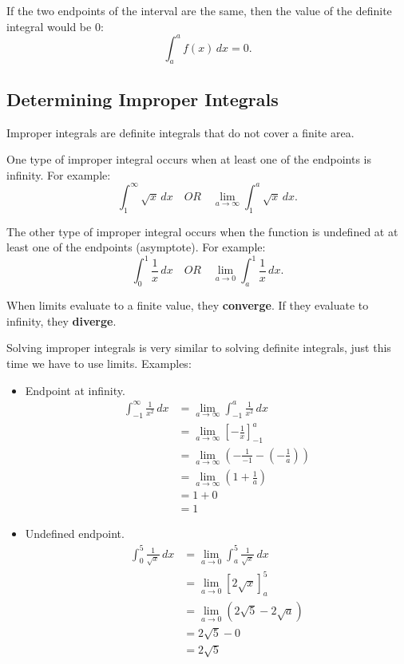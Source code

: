 \documentclass[12pt]{article}
\begin{document}
If the two endpoints of the interval are the same, then the value of the definite integral would be $0$:
\[ \int_{a}^{a} f(x) \, dx = 0. \]

\subsection{Determining Improper Integrals}
\noindent Improper integrals are definite integrals that do not cover a finite area.

One type of improper integral occurs when at least one of the endpoints is infinity. For example:
\[ \int_{1}^{\infty} \sqrt{x} \, dx \quad OR \quad \lim_{a \to \infty} \int_{1}^{a} \sqrt{x} \, dx. \]

The other type of improper integral occurs when the function is undefined at at least one of the endpoints (asymptote). For example:
\[ \int_{0}^{1} \frac{1}{x} \, dx \quad OR \quad \lim_{a \to 0} \int_{a}^{1} \frac{1}{x} \, dx. \]

When limits evaluate to a finite value, they \textbf{converge}. If they evaluate to infinity, they \textbf{diverge}.

Solving improper integrals is very similar to solving definite integrals, just this time we have to use limits. Examples:
\begin{itemize}
	\item Endpoint at infinity.
	      \begin{align*}
		      \int_{-1}^{\infty} \frac{1}{x^2} \, dx & = \lim_{a \to \infty} \int_{-1}^{a} \frac{1}{x^2} \, dx                          \\[6pt]
		      & = \lim_{a \to \infty} \left[ -\frac{1}{x} \right]_{-1}^{a}                       \\[6pt]
		      & = \lim_{a \to \infty} \left( -\frac{1}{-1} - \left( -\frac{1}{a} \right) \right) \\[6pt]
		      & = \lim_{a \to \infty} \left( 1 + \frac{1}{a} \right)                             \\[6pt]
		      & = 1+0                                                                            \\
		      & = 1
	      \end{align*}

	\item Undefined endpoint.
	      \begin{align*}
		      \int_{0}^{5} \frac{1}{\sqrt{x}} \, dx & = \lim_{a \to 0} \int_{a}^{5} \frac{1}{\sqrt{x}} \, dx \\[6pt]
		      & = \lim_{a \to 0} \left[ 2\sqrt{x} \right]_{a}^{5}      \\
		      & = \lim_{a \to 0} \left( 2\sqrt{5} - 2\sqrt{a} \right)  \\
		      & = 2\sqrt{5} - 0                                        \\
		      & = 2\sqrt{5}
	      \end{align*}
\end{itemize}
\end{document}
